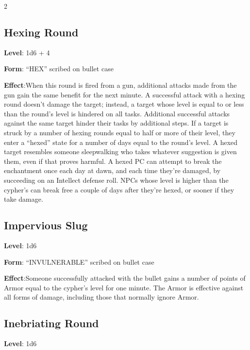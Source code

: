 \begin{multicols}{2}
\subsection{Hexing Round} 

\textbf{Level}: 1d6 + 4 

\textbf{Form}: “HEX” scribed on bullet case 

\textbf{Effect}:When this round is fired from a gun, additional attacks made from the gun gain the same benefit for the next minute. 
A successful attack with a hexing round doesn’t damage the target; instead, a target whose level is equal to or less than the round’s level is hindered on all tasks. Additional successful attacks against the same target hinder their tasks by additional steps. If a target is struck by a number of hexing rounds equal to half or more of their level, they enter a “hexed” state for a number of days equal to the round’s level. A hexed target resembles someone sleepwalking who takes whatever suggestion is given them, even if that proves harmful. A hexed PC can attempt to break the enchantment once each day at dawn, and each time they’re damaged, by succeeding on an Intellect defense roll. NPCs whose level is higher than the cypher’s can break free a couple of days after they’re hexed, or sooner if they take damage. 

\subsection{Impervious Slug} 

\textbf{Level}: 1d6 

\textbf{Form}: “INVULNERABLE” scribed on bullet case 

\textbf{Effect}:Someone successfully attacked with the bullet gains a number of points of Armor equal to the cypher’s level for one minute. The Armor is effective against all forms of damage, including those that normally ignore Armor.

\subsection{Inebriating Round}

\textbf{Level}: 1d6 


\end{multicols}
